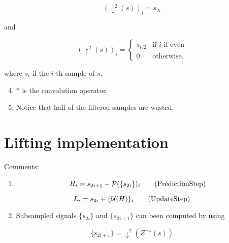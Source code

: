 \begin{equation}
    (\downarrow^2(s))_i = s_{2i}
\end{equation}

and

\begin{equation}
    (\uparrow^2(s))_i =
  \left\{
  \begin{array}{ll}
    s_{i/2} & \text{if $i$ if even} \\
    0 & \text{otherwise}.
  \end{array}
  \right.
  \end{equation}

where \(s_i\) if the \(i\)-th sample of \(s\).

\begin{enumerate}
\setcounter{enumi}{3}
\item
  \(*\) is the convolution operator.
\item
  Notice that half of the filtered samples are wasted.
\end{enumerate}

\section{Lifting implementation~\cite{sweldens1997building}}

Comments:

\begin{enumerate}
\tightlist
\item
  \begin{equation}
  H_i = s_{2i+1} - {\cal P}(\{s_{2i}\})_i
  \tag{PredictionStep}
  \label{eq:PredictionStep}
  \end{equation}
\end{enumerate}

\begin{equation}
  L_i = s_{2i} + \{{\cal U}(H)\}_i
  \tag{UpdateStep}
  \label{eq:UpdateStep}
\end{equation}

\begin{enumerate}
\setcounter{enumi}{1}
\tightlist
\item
  Subsampled signals \(\{s_{2i}\}\) and \(\{s_{2i+1}\}\) can been
  computed by using
\end{enumerate}

\begin{equation*}
   \{s_{2i+1}\} = \downarrow^2(Z^{-1}(s))
\end{equation*}

